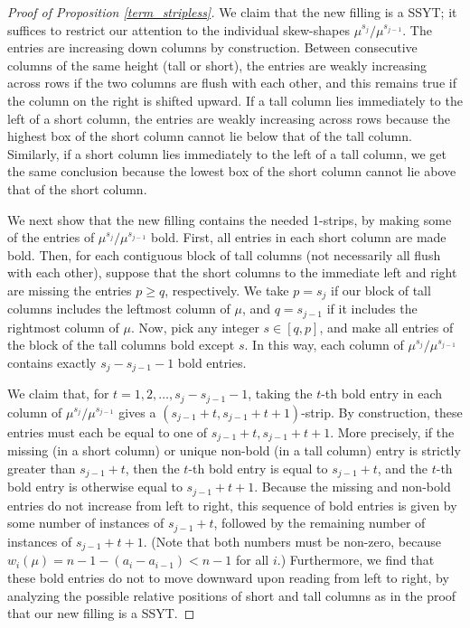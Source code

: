\begin{proof}[Proof of Proposition \ref{term_stripless}]
We claim that the new filling is a SSYT; it suffices to restrict our attention to the individual skew-shapes $\mu^{s_j}/\mu^{s_{j-1}}$. The entries are increasing down columns by construction. Between consecutive columns of the same height (tall or short), the entries are weakly increasing across rows if the two columns are flush with each other, and this remains true if the column on the right is shifted upward. If a tall column lies immediately to the left of a short column, the entries are weakly increasing across rows because the highest box of the short column cannot lie below that of the tall column. Similarly, if a short column lies immediately to the left of a tall column, we get the same conclusion because the lowest box of the short column cannot lie above that of the short column.

We next show that the new filling contains the needed 1-strips, by making some of the entries of $\mu^{s_j}/\mu^{s_{j-1}}$ bold. First, all entries in each short column are made bold. Then, for each contiguous block of tall columns (not necessarily all flush with each other), suppose that the short columns to the immediate left and right are missing the entries $p\ge q$, respectively. We take $p=s_j$ if our block of tall columns includes the leftmost column of $\mu$, and $q=s_{j-1}$ if it includes the rightmost column of $\mu$. Now, pick any integer $s\in[q,p]$, and make all entries of the block of the tall columns bold except $s$. In this way, each column of $\mu^{s_j}/\mu^{s_{j-1}}$ contains exactly $s_j-s_{j-1}-1$ bold entries.

We claim that, for $t=1,2,\ldots,s_j-s_{j-1}-1$, taking the $t$-th bold entry in each column of $\mu^{s_j}/\mu^{s_{j-1}}$ gives a $(s_{j-1}+t,s_{j-1}+t+1)$-strip. By construction, these entries must each be equal to one of $s_{j-1}+t,s_{j-1}+t+1$. More precisely, if the missing (in a short column) or unique non-bold (in a tall column) entry is strictly greater than $s_{j-1}+t$, then the $t$-th bold entry is equal to $s_{j-1}+t$, and the $t$-th bold entry is otherwise equal to $s_{j-1}+t+1$. Because the missing and non-bold entries do not increase from left to right, this sequence of bold entries is given by some number of instances of $s_{j-1}+t$, followed by the remaining number of instances of $s_{j-1}+t+1$. (Note that both numbers must be non-zero, because $w_i(\mu)=n-1-(a_i-a_{i-1})<n-1$ for all $i$.) Furthermore, we find that these bold entries do not to move downward upon reading from left to right, by analyzing the possible relative positions of short and tall columns as in the proof that our new filling is a SSYT.


\end{proof}
